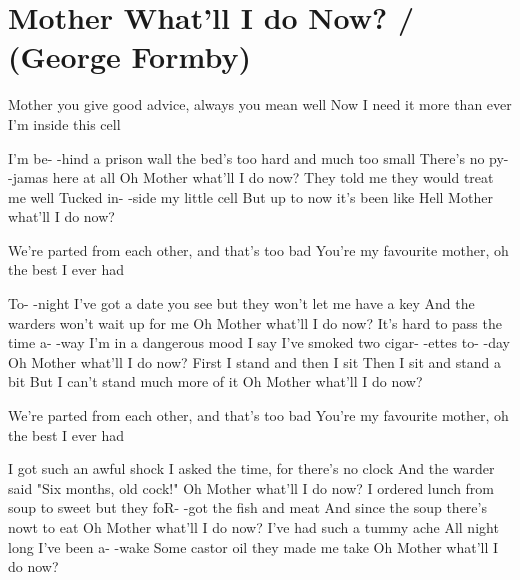 \section{Mother What'll I do Now? / (George Formby)}\label{sec:mother_what_ll_i_do_now_}
Mother you give good advice, always you mean well
Now I need it more than ever I'm inside
this cell

I'm be- -hind a prison wall
the bed's too hard and much too small
There's no py- -jamas here at all
Oh Mother what'll I do now?
They told me they would treat me well
Tucked in- -side my little cell
But up to now it's been like Hell
Mother what'll I do now?

We're parted from each other, and that's too bad
You're my favourite mother, oh the best I ever had

To- -night I've got a date you see
but they won't let me have a key
And the warders won't wait up for me
Oh Mother what'll I do now?
It's hard to pass the time a- -way
I'm in a dangerous mood I say
I've smoked two cigar- -ettes to- -day
Oh Mother what'll I do now?
First I stand and then I sit
Then I sit and stand a bit
But I can't stand much more of it
Oh Mother what'll I do now?

We're parted from each other, and that's too bad
You're my favourite mother, oh the best I ever had

I got such an awful shock
I asked the time, for there's no clock
And the warder said "Six months, old 
cock!"
Oh Mother what'll I do now?
I ordered lunch from soup to sweet
but they foR- -got the fish and meat
And since the soup there's nowt to eat
Oh Mother what'll I do now?
I've had such a tummy ache
All night long I've been a- -wake
Some castor oil they made me take
Oh Mother what'll I do now?

